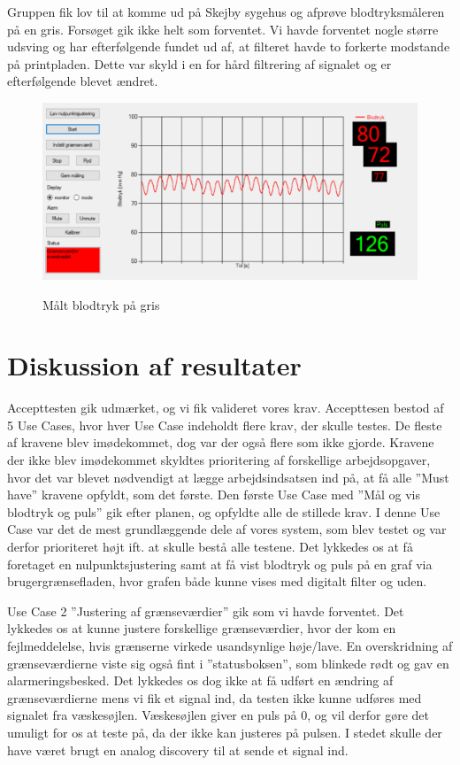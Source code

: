 Gruppen fik lov til at komme ud på Skejby sygehus og afprøve blodtryksmåleren på en gris. Forsøget gik ikke helt som forventet. Vi havde forventet nogle større udsving og har efterfølgende fundet ud af, at filteret havde to forkerte modstande på printpladen. Dette var skyld i en for hård filtrering af signalet og er efterfølgende blevet ændret.

\vspace{0.5 cm}
\begin{figure}[h!]
	\centering
	\includegraphics[width=0.7\linewidth]{Resultater/Resultater/gris}
	\label{fig:gris}
	\caption{Målt blodtryk på gris}
\end{figure}

\section{Diskussion af resultater}

Accepttesten gik udmærket, og vi fik valideret vores krav. Accepttesen bestod af 5 Use Cases, hvor hver Use Case indeholdt flere krav, der skulle testes. De fleste af kravene blev imødekommet, dog var der også flere som ikke gjorde. Kravene der ikke blev imødekommet skyldtes prioritering af forskellige arbejdsopgaver, hvor det var blevet nødvendigt at lægge arbejdsindsatsen ind på, at få alle ”Must have” kravene opfyldt, som det første.
Den første Use Case med ”Mål og vis blodtryk og puls” gik efter planen, og opfyldte alle de stillede krav. I denne Use Case var det de mest grundlæggende dele af vores system, som blev testet og var derfor prioriteret højt ift. at skulle bestå alle testene. Det lykkedes os at få foretaget en nulpunktsjustering samt at få vist blodtryk og puls på en graf via brugergrænsefladen, hvor grafen både kunne vises med digitalt filter og uden. 

Use Case 2 ”Justering af grænseværdier” gik som vi havde forventet. Det lykkedes os at kunne justere forskellige grænseværdier, hvor der kom en fejlmeddelelse, hvis grænserne virkede usandsynlige høje/lave.  En overskridning af grænseværdierne viste sig også fint i ”statusboksen”, som blinkede rødt og gav en alarmeringsbesked. Det lykkedes os dog ikke at få udført en ændring af grænseværdierne mens vi fik et signal ind, da testen ikke kunne udføres med signalet fra væskesøjlen. Væskesøjlen giver en puls på 0, og vil derfor gøre det umuligt for os at teste på, da der ikke kan justeres på pulsen. I stedet skulle der have været brugt en analog discovery til at sende et signal ind.

